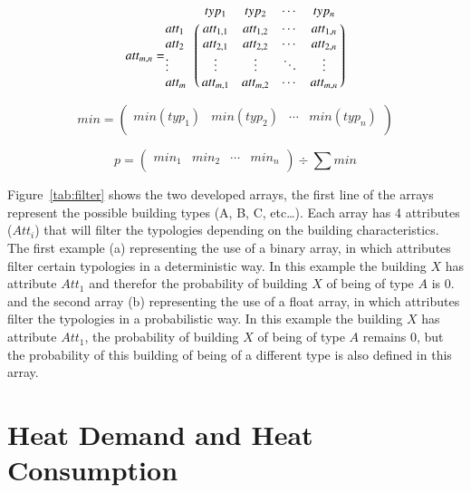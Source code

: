 \documentclass[authoryear,preprint,review,12pt]{elsarticle}
\begin{document}
\begin{linenumbers}
\begin{equation} \label{eq:att}
att_{m,n} = \bordermatrix{~ & typ_1 & typ_2 & \cdots & typ_n \cr
	att_1 & att_{1,1} & att_{1,2} & \cdots & att_{1,n} \cr
	att_2 & att_{2,1} & att_{2,2} & \cdots & att_{2,n} \cr
	\vdots & \vdots  & \vdots  & \ddots & \vdots  \cr
	att_m & att_{m,1} & att_{m,2} & \cdots & att_{m,n}}
\end{equation}

\begin{equation} \label{eq:att1}
min = 
 \begin{pmatrix}
 min(typ_1) &
 min(typ_2) &
 \cdots &
 min(typ_n) \\
 \end{pmatrix}
\end{equation}

\begin{equation} \label{eq:att2}
p = 
 \begin{pmatrix}
 min_1 &
 min_2 &
 \cdots &
 min_n \\
 \end{pmatrix}
 \div \sum min
\end{equation}




Figure~\ref{tab:filter} shows the two developed arrays, the first line of the
arrays represent the possible building types (A, B, C, etc\dots).  Each array
has 4 attributes ($Att_{i}$) that will filter the typologies depending on the
building characteristics.  The first example (a) representing the use of a
binary array, in which attributes filter certain typologies in a deterministic
way. In this example the building $X$ has attribute $Att_1$ and therefor the
probability of building $X$ of being of type $A$ is 0.  and the second array
(b) representing the use of a float array, in which attributes filter the
typologies in a probabilistic way. In this example the building $X$ has
attribute $Att_1$, the probability of building $X$ of being of type $A$ remains
0, but the probability of this building of being of a different type is also
defined in this array.

\section{Heat Demand and Heat Consumption}\label{sec:result}


\end{linenumbers}
\end{document}
